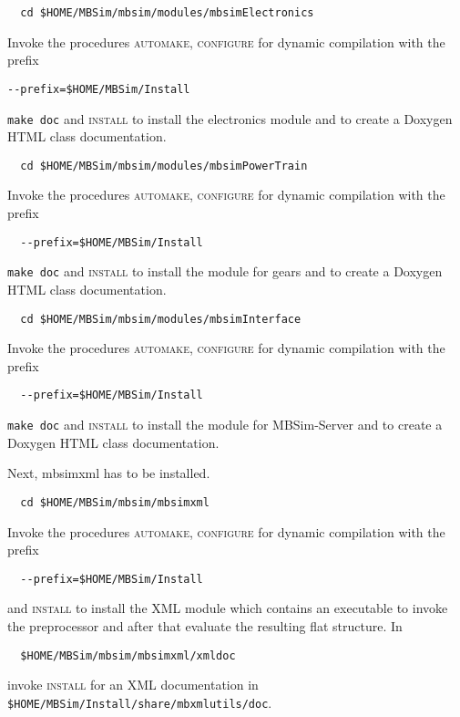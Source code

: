 \begin{verbatim}
  cd $HOME/MBSim/mbsim/modules/mbsimElectronics
\end{verbatim}
Invoke the procedures \textsc{automake, configure} for dynamic compilation with the prefix
\begin{verbatim}
--prefix=$HOME/MBSim/Install
\end{verbatim}
\texttt{make doc} and \textsc{install} to install the electronics module and to create a Doxygen HTML class documentation.\vspace{5mm}
\begin{verbatim}
  cd $HOME/MBSim/mbsim/modules/mbsimPowerTrain
\end{verbatim}
Invoke the procedures \textsc{automake, configure} for dynamic compilation with the prefix
\begin{verbatim}
  --prefix=$HOME/MBSim/Install
\end{verbatim}
\texttt{make doc} and \textsc{install} to install the module for gears and to create a Doxygen HTML class documentation.\vspace{5mm} 
\begin{verbatim}
  cd $HOME/MBSim/mbsim/modules/mbsimInterface
\end{verbatim}
Invoke the procedures \textsc{automake, configure} for dynamic compilation with the prefix
\begin{verbatim}
  --prefix=$HOME/MBSim/Install
\end{verbatim}
\texttt{make doc} and \textsc{install} to install the module for MBSim-Server and to create a Doxygen HTML class documentation.\vspace{5mm} 

Next, mbsimxml has to be installed.
\begin{verbatim}
  cd $HOME/MBSim/mbsim/mbsimxml
\end{verbatim}
Invoke the procedures \textsc{automake, configure} for dynamic compilation with the prefix
\begin{verbatim}
  --prefix=$HOME/MBSim/Install
\end{verbatim}
and \textsc{install} to install the XML module which contains an executable to invoke the preprocessor and after that evaluate the resulting flat structure. In
\begin{verbatim}
  $HOME/MBSim/mbsim/mbsimxml/xmldoc
\end{verbatim}
invoke \textsc{install} for an XML documentation in \texttt{\$HOME/MBSim/Install/share/mbxmlutils/doc}.

